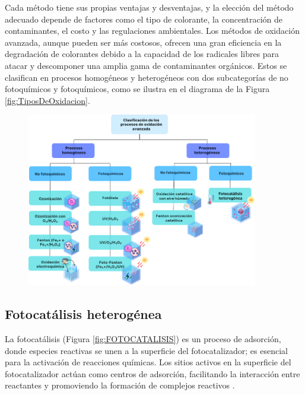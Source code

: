 \documentclass[12pt]{article}
\begin{document}
Cada método tiene sus propias ventajas y desventajas, y la elección del método adecuado depende de factores como el tipo de colorante, la concentración de contaminantes, el costo y las regulaciones ambientales. Los métodos de oxidación avanzada, aunque pueden ser más costosos, ofrecen una gran eficiencia en la degradación de colorantes debido a la capacidad de los radicales libres para atacar y descomponer una amplia gama de contaminantes orgánicos. Estos se clasifican en procesos homogéneos y heterogéneos con dos subcategorías de no fotoquímicos y fotoquímicos, como se ilustra en el diagrama de la Figura \ref{fig:TiposDeOxidacion}.
 \begin{figure}[H]
    	   \begin{center}
     	  	\includegraphics[width = 0.9\textwidth]{Imagenes/TiposDeOxidacion (2).png}
    	   \end{center} 
        \end{figure}
 \subsection{Fotocatálisis heterogénea }
 La fotocatálisis (Figura \ref{fig:FOTOCATALISIS}) es un proceso de adsorción, donde especies reactivas se unen a la superficie del fotocatalizador; es esencial para la activación de reacciones químicas. Los sitios activos en la superficie del fotocatalizador actúan como centros de adsorción, facilitando la interacción entre reactantes y promoviendo la formación de complejos reactivos \cite{IEEEreferencias:Ref6, IEEEreferencias:Ref10}.
\vspace{1em} %
\end{document}

